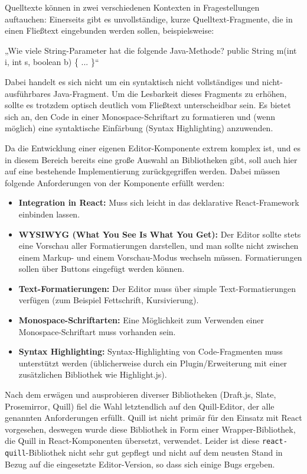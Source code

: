 Quelltexte können in zwei verschiedenen Kontexten in Fragestellungen auftauchen: Einerseits gibt es unvollständige, kurze Quelltext-Fragmente, die in einen Fließtext eingebunden werden sollen, beispielsweise:

\begin{center}
„Wie viele String-Parameter hat die folgende Java-Methode?\newline
public String m(int i, int s, boolean b) \{ ... \}“
\end{center}

Dabei handelt es sich nicht um ein syntaktisch nicht vollständiges und nicht-ausführbares Java-Fragment. Um die Lesbarkeit dieses Fragments zu erhöhen, sollte es trotzdem optisch deutlich vom Fließtext unterscheidbar sein. Es bietet sich an, den Code in einer Monospace-Schriftart zu formatieren und (wenn möglich) eine syntaktische Einfärbung (Syntax Highlighting) anzuwenden.

Da die Entwicklung einer eigenen Editor-Komponente extrem komplex ist, und es in diesem Bereich bereits eine große Auswahl an Bibliotheken gibt, soll auch hier auf eine bestehende Implementierung zurückgegriffen werden. Dabei müssen folgende Anforderungen von der Komponente erfüllt werden:

\begin{itemize}
    \item \textbf{Integration in React:}  Muss sich leicht in das deklarative React-Framework einbinden lassen.
    \item \textbf{WYSIWYG (What You See Is What You Get):} Der Editor sollte stets eine Vorschau aller Formatierungen darstellen, und man sollte nicht zwischen einem Markup- und einem Vorschau-Modus wechseln müssen. Formatierungen sollen über Buttons eingefügt werden können.
    \item \textbf{Text-Formatierungen:} Der Editor muss über simple Text-Formatierungen verfügen (zum Beispiel Fettschrift, Kursivierung).
    \item \textbf{Monospace-Schriftarten:} Eine Möglichkeit zum Verwenden einer Monospace-Schriftart muss vorhanden sein.
    \item \textbf{Syntax Highlighting:} Syntax-Highlighting von Code-Fragmenten muss unterstützt werden (üblicherweise durch ein Plugin/Erweiterung mit einer zusätzlichen Bibliothek wie Highlight.js).
\end{itemize}

Nach dem erwägen und ausprobieren diverser Bibliotheken (Draft.js, Slate, Prosemirror, Quill) fiel die Wahl letztendlich auf den Quill-Editor, der alle genannten Anforderungen erfüllt. Quill ist nicht primär für den Einsatz mit React vorgesehen, deswegen wurde diese Bibliothek in Form einer Wrapper-Bibliothek, die Quill in React-Komponenten übersetzt, verwendet. Leider ist diese \texttt{react-quill}-Bibliothek nicht sehr gut gepflegt und nicht auf dem neusten Stand in Bezug auf die eingesetzte Editor-Version, so dass sich einige Bugs ergeben.

